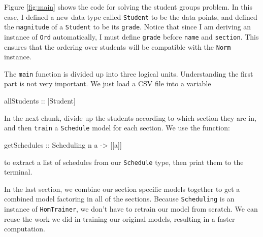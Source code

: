 \documentclass[tikz]{tmr}
\newcommand\h{\lstinline}
\newcommand\+{\mdoubleplus}
\begin{document}
Figure \ref{fig:main} shows the code for solving the student groups problem.
In this case, I defined a new data type called \h{Student} to be the data points, and defined the \h{magnitude} of a \h{Student} to be its \h{grade}.
Notice that since I am deriving an instance of \h{Ord} automatically, I must define \h{grade} before \h{name} and \h{section}.
This ensures that the ordering over students will be compatible with the \h{Norm} instance.

The \h{main} function is divided up into three logical units.
Understanding the first part is not very important.
We just load a CSV file into a variable
\begin{spec}
allStudents :: [Student]
\end{spec}
In the next chunk, divide up the students according to which section they are in, and then \h{train} a \h{Schedule} model for each section.
We use the function:
\begin{spec}
getSchedules :: Scheduling n a -> [[a]]
\end{spec}
to extract a list of schedules from our \h{Schedule} type, then print them to the terminal.

In the last section, we combine our section specific models together to get a combined model factoring in all of the sections.
Because \h{Scheduling} is an instance of \h{HomTrainer}, we don't have to retrain our model from scratch.
We can reuse the work we did in training our original models, resulting in a faster computation.

\end{document}

